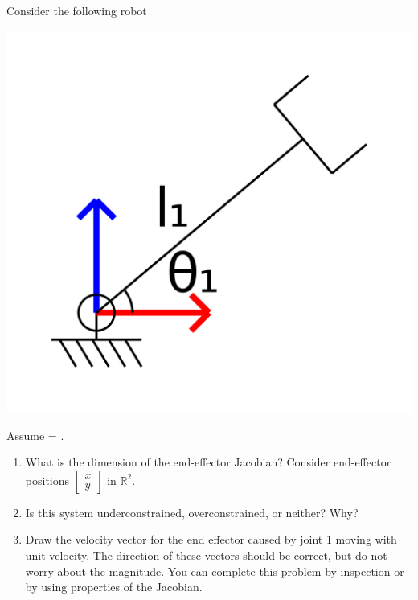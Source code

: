 \documentclass{16384_doc} %
\begin{document}
\begin{questions}

    Consider the following robot
    \begin{center}
    \includegraphics[scale=0.07]{generated_figures/R_nonsingular.png}
    \end{center}

        Assume \th[1] = .
    \begin{enumerate} [label=\alph*.]
        \item \text{[1 point]} What is the dimension of the end-effector Jacobian? Consider
        end-effector positions $\begin{bmatrix} x\\ y \end{bmatrix}$ in $\mathbb{R}^2$.
        \begin{tcolorbox}[height=3cm]
        \end{tcolorbox}
        
        \item \text{[1 point]} Is this system underconstrained, overconstrained, or neither?
        Why?
        \begin{tcolorbox}[height=3cm]
        \end{tcolorbox}

        
        \item \text{[2 points]} Draw the velocity vector for the end effector caused by joint 1
        moving with unit velocity. The direction of these vectors should be
        correct, but do not worry about the magnitude. You can complete this
        problem by inspection or by using properties of the Jacobian.


\end{enumerate}
\end{questions}
\end{document}
